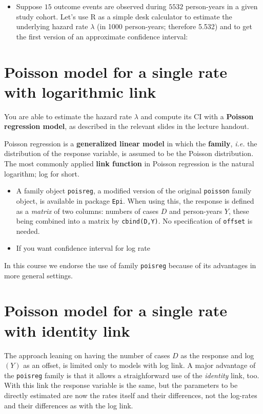 \documentclass[
]{book}
\providecommand{\tightlist}{%
  \setlength{\itemsep}{0pt}\setlength{\parskip}{0pt}}
\begin{document}
\begin{itemize}
\tightlist
\item
  Suppose \(15\) outcome events are observed during \(5532\) person-years in a given study cohort.
  Let's use R as a simple desk calculator to estimate the underlying hazard rate \(\lambda\) (in 1000
  person-years; therefore 5.532) and to get the first version of an approximate confidence
  interval:
\end{itemize}

\section{Poisson model for a single rate with logarithmic link}\label{poisson-model-for-a-single-rate-with-logarithmic-link}

You are able to estimate the hazard rate \(\lambda\) and compute its CI with a \textbf{Poisson regression model}, as described in the relevant slides in the lecture handout.

Poisson regression is a \textbf{generalized linear model} in which the \textbf{family}, \emph{i.e.} the distribution of the response variable, is assumed to be the Poisson distribution. The most commonly applied \textbf{link function}
in Poisson regression is the natural logarithm; log for short.

\begin{itemize}
\item
  A family object \texttt{poisreg}, a modified version of the original \texttt{poisson} family object, is available
  in package \texttt{Epi}. When using this, the response is defined as a \emph{matrix} of two columns: numbers
  of cases \(D\) and person-years \(Y\), these being combined into a matrix by \texttt{cbind(D,Y)}. No specification
  of \texttt{offset} is needed.
\item
  If you want confidence interval for log rate
\end{itemize}

In this course we endorse the use of family \texttt{poisreg} because of its advantages in more general settings.

\section{Poisson model for a single rate with identity link}\label{poisson-model-for-a-single-rate-with-identity-link}

The approach leaning on having the number of cases \(D\) as the response and log\((Y)\) as an offset,
is limited only to models with log link. A major advantage of the \texttt{poisreg} family is that it allows
a straighforward use of the \emph{identity} link, too. With this link the response variable is the same, but
the parameters to be directly estimated are now the rates itself and their differences, not the log-rates
and their differences as with the log link.
\end{document}

